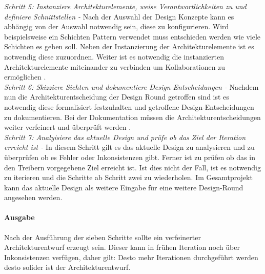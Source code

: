 \emph{Schritt 5: Instanziere Architekturelemente, weise Verantwortlichkeiten zu und definiere Schnittstellen -}
Nach der Auswahl der Design Konzepte kann es abh\"angig von der Auswahl notwendig sein, diese zu konfigurieren. Wird beispielsweise ein Schichten Pattern verwendet muss entschieden werden wie viele Schichten es geben soll. Neben der Instanzierung der Architekturelemente ist es notwendig diese zuzuordnen. Weiter ist es notwendig die instanzierten Architekturelemente miteinander zu verbinden um Kollaborationen zu erm\"oglichen \cite{Cer01}.\\

\emph{Schritt 6: Skizziere Sichten und dokumentiere Design Entscheidungen -}
Nachdem nun die Architekturentscheidung der Design Round getroffen sind ist es notwendig diese formalisiert festzuhalten und getroffene Design-Entscheidungen zu dokumentieren. Bei der Dokumentation m\"ussen die Architekturentscheidungen weiter verfeinert und \"uberpr\"uft werden \cite{Cer01}. \\

\emph{Schritt 7: Analyisiere das aktuelle Design und pr\"ufe ob das Ziel der Iteration erreicht ist -}
In diesem Schritt gilt es das aktuelle Design zu analysieren und zu \"uberpr\"ufen ob es Fehler oder Inkonsistenzen gibt. Ferner ist zu pr\"ufen ob das in den Treibern vorgegebene Ziel erreicht ist. Ist dies nicht der Fall, ist es notwendig zu iterieren und die Schritte ab Schritt zwei zu wiederholen. Im Gesamtprojekt kann das aktuelle Design als weitere Eingabe f\"ur eine weitere Design-Round angesehen werden. 

\paragraph{Ausgabe}
Nach der Ausf\"uhrung der sieben Schritte sollte ein verfeinerter Architekturentwurf erzeugt sein. Dieser kann in fr\"uhen Iteration noch \"uber Inkonsistenzen verf\"ugen, daher gilt: Desto mehr Iterationen durchgef\"uhrt werden desto solider ist der Architekturentwurf.
